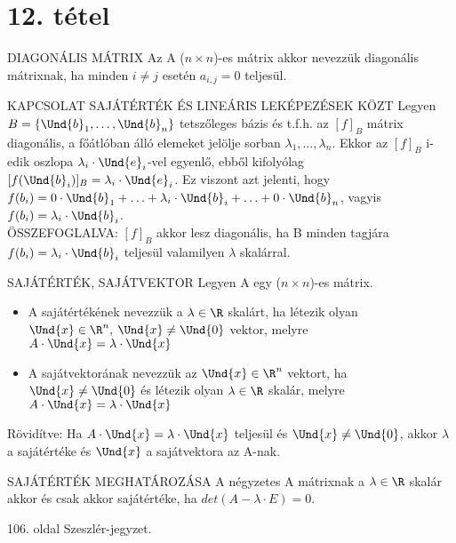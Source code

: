 \section{12. tétel}

\begin{definicio}{DIAGONÁLIS MÁTRIX}
Az A ($n \times n$)-es mátrix akkor nevezzük diagonális mátrixnak, ha minden $i \neq j$ esetén $a_{i,j} = 0$ teljesül.
\end{definicio}

\begin{tetel}{KAPCSOLAT SAJÁTÉRTÉK ÉS LINEÁRIS LEKÉPEZÉSEK KÖZT}
Legyen $B = \{\Und{b}_1, \ldots, \Und{b}_n\}$ tetszőleges bázis és t.f.h. az $[f]_B$ mátrix diagonális, a főátlóban álló elemeket jelölje sorban $\lambda_1, \ldots, \lambda_n$. Ekkor az $[f]_B$ i-edik oszlopa $\lambda_i\cdot\Und{e}_i$-vel egyenlő, ebből kifolyólag $[f(\Und{b}_i)]_B = \lambda_i \cdot \Und{e}_i$. Ez viszont azt jelenti, hogy $f(b_i) = 0\cdot\Und{b}_1 + \ldots + \lambda_i \cdot \Und{b}_i + \ldots + 0 \cdot\Und{b}_n$, vagyis $f(b_i) = \lambda_i \cdot \Und{b}_i$.\\
ÖSSZEFOGLALVA: $[f]_B$ akkor lesz diagonális, ha B minden tagjára $f(b_i) = \lambda_i \cdot \Und{b}_i$ teljesül valamilyen $\lambda$ skalárral.
\end{tetel}

\begin{definicio}{SAJÁTÉRTÉK, SAJÁTVEKTOR}
Legyen A egy ($n \times n$)-es mátrix.
\begin{itemize}
\item A sajátértékének nevezzük a $\lambda \in \R$ skalárt, ha létezik olyan $\Und{x} \in \R^n,\: \Und{x} \neq \Und{0}$ vektor, melyre $A \cdot \Und{x} = \lambda\cdot \Und{x}$
\item A sajátvektorának nevezzük az $\Und{x} \in \R^n$ vektort, ha $\Und{x} \neq \Und{0}$ és létezik olyan $\lambda \in \R$ skalár, melyre $A \cdot \Und{x} = \lambda\cdot \Und{x}$
\end{itemize}
Rövidítve: Ha $A\cdot\Und{x} = \lambda\cdot\Und{x}$ teljesül és $\Und{x} \neq \Und{0}$, akkor $\lambda$ a sajátértéke és $\Und{x}$ a sajátvektora az A-nak.
\end{definicio}

\begin{tetel}{SAJÁTÉRTÉK MEGHATÁROZÁSA}
A négyzetes A mátrixnak a $\lambda \in \R$ skalár akkor és csak akkor sajátértéke, ha $det(A - \lambda\cdot E) = 0$.
\end{tetel}

\begin{bizonyitas}{}
106. oldal Szeszlér-jegyzet.
\end{bizonyitas}

